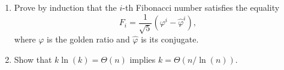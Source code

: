 \documentclass[Chapter03]{subfiles}
\begin{document}
\begin{enumerate}

		\item Prove by induction that the $i$-th Fibonacci number satisfies the equality
		\[
			F_i = \frac{1}{\sqrt{5}}(\varphi^i - \hat\varphi^i),
		\]
		where $\varphi$ is the golden ratio and $\hat\varphi$ is its conjugate.
		\begin{answer}
			
		\end{answer}

		\item Show that $k\ln(k) = \Theta(n)$ implies $k = \Theta(n / \ln(n))$.
		\begin{answer}
			
		\end{answer}

	\end{enumerate}
\end{document}
